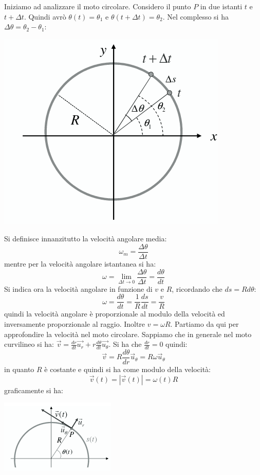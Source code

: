 \documentclass[a4paper,12pt, oneside]{book}
\begin{document}
Iniziamo ad analizzare il moto circolare. Considero il punto $P$ in due istanti $t$ e $t+\Delta t$. Quindi avrò $\theta (t)=\theta_1$ e $\theta(t+\Delta t)=\theta_2$. Nel complesso si ha $\Delta \theta= \theta_2-\theta_1$:
\begin{center}
\includegraphics[scale=0.52]{img/cir2.png}
\end{center}
Si definisce innanzitutto la velocità angolare media:
$$\omega_m=\frac{\Delta\theta}{\Delta t}$$
mentre per la velocità angolare istantanea si ha:
$$\omega=\lim_{\Delta t\to 0}\frac{\Delta\theta}{\Delta t}=\frac{d\theta}{dt}$$
Si indica ora la velocità angolare in funzione di $v$ e $R$, ricordando che $ds=Rd\theta$:
$$\omega=\frac{d\theta}{dt}=\frac{1}{R}\frac{ds}{dt}=\frac{v}{R}$$
quindi la velocità angolare è proporzionale al modulo della velocità ed inversamente proporzionale al raggio. Inoltre $v=\omega R$. Partiamo da qui per approfondire la velocità nel moto circolare. Sappiamo che in generale nel moto curvilineo si ha: $\vec{v}=\frac{dr}{dt}\vec{u_r}+r\frac{d\theta}{dt}\vec{u_\theta}$. Si ha che $\frac{dr}{dt}=0$ quindi:
$$\vec{v}=R\frac{d\theta}{dr}\vec{u}_\theta=R\omega\vec{u}_\theta$$
\newpage
in quanto $R$ è costante e quindi si ha come modulo della velocità:
$$\vec{v}(t)=|\vec{v}(t)|=\omega(t)R$$
graficamente si ha:
\begin{center}
\includegraphics[scale=0.9]{img/cir3.png}
\end{center}
\end{document}
